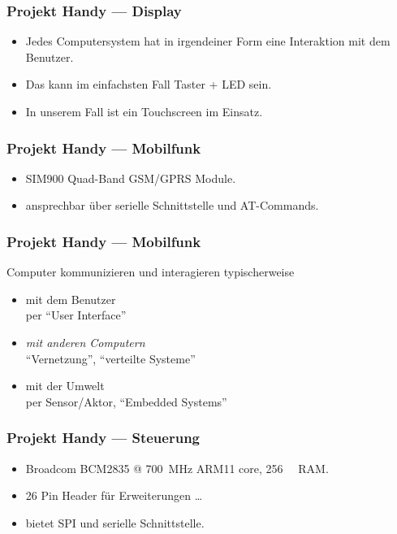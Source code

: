 \begin{frame}
	\frametitle{Projekt Handy --- Display}

	\begin{itemize}
		\item Jedes Computersystem hat in irgendeiner Form eine Interaktion mit
			dem Benutzer.
		\item Das kann im einfachsten Fall  Taster + LED sein.
		\item In unserem Fall ist ein Touchscreen im Einsatz.
	\end{itemize}
\end{frame}

\begin{frame}
	\frametitle{Projekt Handy --- Mobilfunk}


	\vspace{-0.5cm}

	\begin{itemize}
		\item SIM900 Quad-Band GSM/GPRS Module.
		\item ansprechbar über serielle Schnittstelle und AT-Commands.
	\end{itemize}
\end{frame}

\begin{frame}
	\frametitle{Projekt Handy --- Mobilfunk}

	\begin{block}{Computer kommunizieren und interagieren typischerweise}
		\begin{itemize}
			\item mit dem Benutzer\\
			per ``User Interface''
			\item \emph{mit anderen Computern} \\
			``Vernetzung'', ``verteilte Systeme''
			\item mit der Umwelt\\
			 per Sensor/Aktor, ``Embedded Systems''
		\end{itemize}
	\end{block}
\end{frame}

\begin{frame}
	\frametitle{Projekt Handy --- Steuerung}
\vspace{-0,5cm}
	\begin{itemize}
		\item Broadcom BCM2835 @ \SI{700}{\mega\hertz} ARM11 core,
			\SI{256}{\mega\byte}  RAM.
		\item 26 Pin Header für Erweiterungen \ldots
		\item bietet SPI und serielle Schnittstelle.
	\end{itemize}
\end{frame}

